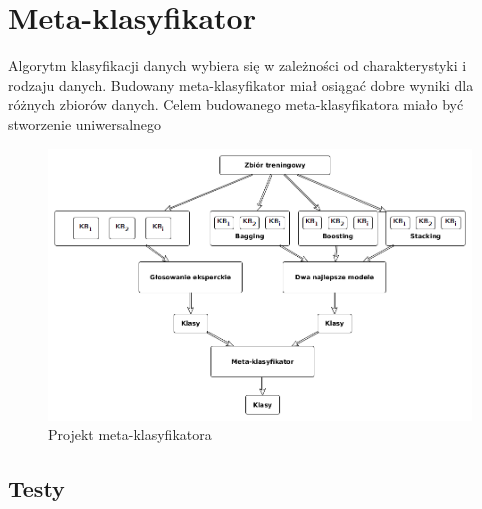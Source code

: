 \section{Meta-klasyfikator}
Algorytm klasyfikacji danych wybiera się w zależności od charakterystyki i rodzaju danych. Budowany meta-klasyfikator miał osiągać dobre wyniki dla różnych zbiorów danych. 
Celem budowanego meta-klasyfikatora miało być stworzenie uniwersalnego 
\begin{figure}[H]
	\centering
	\includegraphics[width=\textwidth]{./images/metaklas.png}
	\caption{Projekt meta-klasyfikatora}
	\label{fig:metaklasmoj}
\end{figure}
\subsection{Testy}